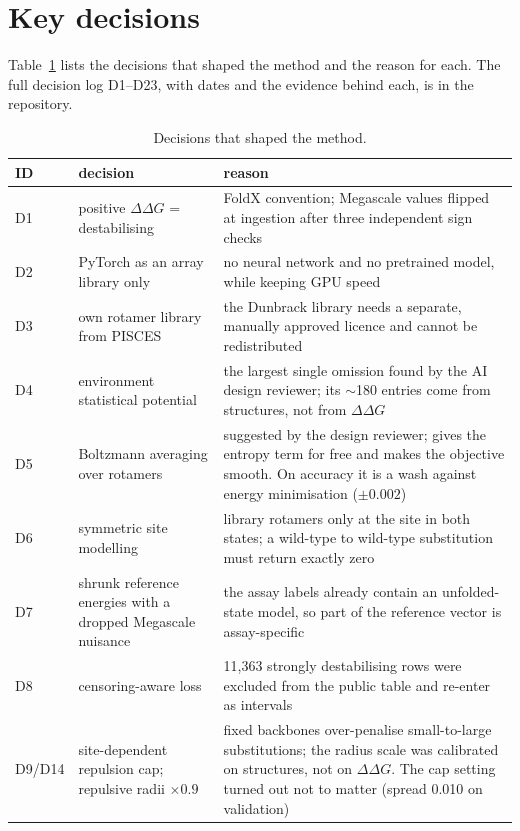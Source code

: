 \documentclass[unnumsec,webpdf,contemporary,large]{oup-authoring-template}
\begin{document}
\section{Key decisions}

Table~\ref{tab:decisions} lists the decisions that shaped the method and the reason for each. The full
decision log D1--D23, with dates and the evidence behind each, is in the repository.

\begin{table}[t]
\caption{Decisions that shaped the method.}
\label{tab:decisions}
\small
\begin{tabular*}{\textwidth}{@{\extracolsep\fill}lp{}p{}@{}}
\toprule
ID & decision & reason \\
\midrule
D1 & positive $\Delta\Delta G$ = destabilising & FoldX convention; Megascale values flipped at ingestion after three independent sign checks \\
D2 & PyTorch as an array library only & no neural network and no pretrained model, while keeping GPU speed \\
D3 & own rotamer library from PISCES & the Dunbrack library needs a separate, manually approved licence and cannot be redistributed \\
D4 & environment statistical potential & the largest single omission found by the AI design reviewer; its $\sim$180 entries come from structures, not from $\Delta\Delta G$ \\
D5 & Boltzmann averaging over rotamers & suggested by the design reviewer; gives the entropy term for free and makes the objective smooth. On accuracy it is a wash against energy minimisation ($\pm 0.002$) \\
D6 & symmetric site modelling & library rotamers only at the site in both states; a wild-type to wild-type substitution must return exactly zero \\
D7 & shrunk reference energies with a dropped Megascale nuisance & the assay labels already contain an unfolded-state model, so part of the reference vector is assay-specific \\
D8 & censoring-aware loss & 11,363 strongly destabilising rows were excluded from the public table and re-enter as intervals \\
D9/D14 & site-dependent repulsion cap; repulsive radii $\times 0.9$ & fixed backbones over-penalise small-to-large substitutions; the radius scale was calibrated on structures, not on $\Delta\Delta G$. The cap setting turned out not to matter (spread 0.010 on validation) \\

\end{tabular*}
\end{table}
\end{document}

